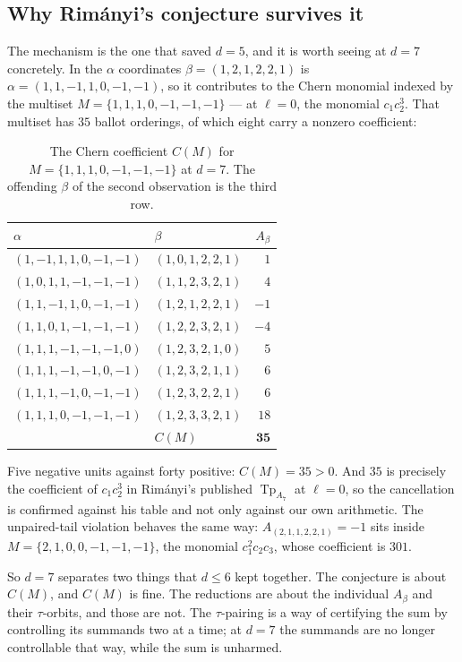 \documentclass[11pt,a4paper]{article}
\DeclareMathOperator{\Tp}{Tp}
\theoremstyle{plain}
\theoremstyle{definition}
\theoremstyle{remark}
\begin{document}
\subsection{Why Rim\'anyi's conjecture survives it}

The mechanism is the one that saved $d = 5$, and it is worth seeing at $d = 7$ concretely.  In the
$\alpha$ coordinates $\beta = (1,2,1,2,2,1)$ is $\alpha = (1,1,-1,1,0,-1,-1)$, so it contributes to
the Chern monomial indexed by the multiset $M = \{1,1,1,0,-1,-1,-1\}$ --- at $\ell = 0$, the
monomial $c_1 c_2^3$.  That multiset has $35$ ballot orderings, of which eight carry a nonzero
coefficient:

\begin{table}[ht]
\centering
\caption{The Chern coefficient $C(M)$ for $M = \{1,1,1,0,-1,-1,-1\}$ at $d = 7$.  The offending
$\beta$ of the second observation is the third row.}
\label{tab:a7cancel}
\begin{tabularx}{\textwidth}{@{}LLr@{}}
\toprule
$\alpha$ & $\beta$ & $A_\beta$ \\
\midrule
$(1,-1,1,1,0,-1,-1)$ & $(1,0,1,2,2,1)$ & $1$ \\
$(1,0,1,1,-1,-1,-1)$ & $(1,1,2,3,2,1)$ & $4$ \\
$(1,1,-1,1,0,-1,-1)$ & $(1,2,1,2,2,1)$ & $-1$ \\
$(1,1,0,1,-1,-1,-1)$ & $(1,2,2,3,2,1)$ & $-4$ \\
$(1,1,1,-1,-1,-1,0)$ & $(1,2,3,2,1,0)$ & $5$ \\
$(1,1,1,-1,-1,0,-1)$ & $(1,2,3,2,1,1)$ & $6$ \\
$(1,1,1,-1,0,-1,-1)$ & $(1,2,3,2,2,1)$ & $6$ \\
$(1,1,1,0,-1,-1,-1)$ & $(1,2,3,3,2,1)$ & $18$ \\
\midrule
& $C(M)$ & $\mathbf{35}$ \\
\bottomrule
\end{tabularx}
\end{table}

Five negative units against forty positive: $C(M) = 35 > 0$.  And $35$ is precisely the
coefficient of $c_1 c_2^3$ in Rim\'anyi's published $\Tp_{A_7}$ at $\ell = 0$, so the cancellation
is confirmed against his table and not only against our own arithmetic.  The unpaired-tail
violation behaves the same way: $A_{(2,1,1,2,2,1)} = -1$ sits inside
$M = \{2,1,0,0,-1,-1,-1\}$, the monomial $c_1^2 c_2 c_3$, whose coefficient is $301$.

So $d = 7$ separates two things that $d \le 6$ kept together.  The conjecture is about $C(M)$, and
$C(M)$ is fine.  The reductions are about the individual $A_\beta$ and their $\tau$-orbits, and
those are not.  The $\tau$-pairing is a way of certifying the sum by controlling its summands two
at a time; at $d = 7$ the summands are no longer controllable that way, while the sum is unharmed.
\end{document}
